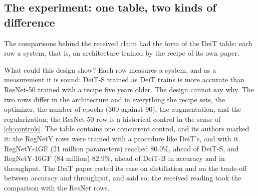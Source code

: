 \begin{refsection}
\section{The experiment: one table, two kinds of difference}\label{sec:confounding:experiment}

The comparisons behind the received claim had the form of the DeiT table: each row a system, that is, an architecture trained by the recipe of its own paper.

\begin{experiment}
\end{experiment}

What could this design show? Each row measures a system, and as a measurement it is sound: DeiT-S trained as DeiT trains is more accurate than ResNet-50 trained with a recipe five years older. The design cannot say why. The two rows differ in the architecture and in everything the recipe sets, the optimizer, the number of epochs (300 against 90), the augmentation, and the regularization; the ResNet-50 row is a historical control in the sense of \cref{ch:controls}. The table contains one concurrent control, and its authors marked it: the RegNetY rows were trained with a procedure like DeiT's, and with it RegNetY-4GF (21 million parameters) reached 80.0\%, ahead of DeiT-S, and RegNetY-16GF (84 million) 82.9\%, ahead of DeiT-B in accuracy and in throughput. The DeiT paper rested its case on distillation and on the trade-off between accuracy and throughput, and said so; the received reading took the comparison with the ResNet rows.


\end{refsection}
